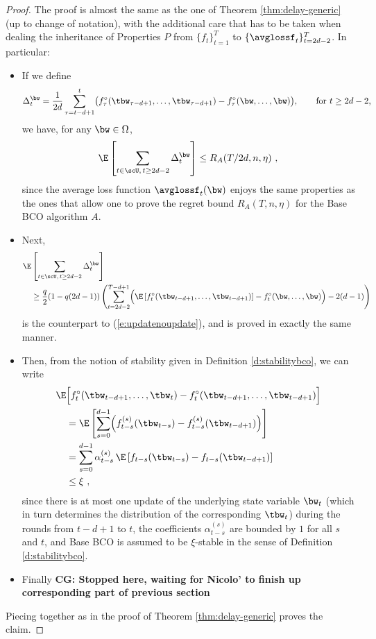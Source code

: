 %
\begin{proof}
The proof is almost the same as the one of Theorem \ref{thm:delay-generic} (up to change of notation), with the additional care that has to be taken when dealing the inheritance of Properties $P$ from $\{f_t\}_{t=1}^T$ to $\{\avglossf_t\}_{t=2d-2}^T$.
%
In particular:
\begin{itemize}
\item If we define
\[
\Delta_t^{\bw} = \frac{1}{2d}\sum_{\tau=t-d+1}^t \bigl(\fcomp_\tau(\tbw_{\tau-d+1},\dots,\tbw_{\tau-d+1}) - \fcomp_\tau(\bw,\dots,\bw)\bigl),\qquad {\mbox{for $t \geq 2d-2$,}}
\]
we have, for any $\bw \in \Omega$,
\[
\E\left[\sum_{t \in \scU,\, t\geq 2d-2} \Delta_t^{\bw}  \right] \leq R_A(T/2d, n ,\eta)~,
\]
since the average loss function $\avglossf_t(\bw)$ enjoys the same properties as the ones that allow one to prove the regret bound $R_A(T, n ,\eta)$ for the Base BCO algorithm $A$.
%
\item Next,
%
\begin{align*}
\E&\left[\sum_{t \in \scU,\,t\geq 2d-2} \Delta_t^{\bw} \right] \\
  &\geq
    \frac{q}{2}(1-q(2d-1))\left(\sum_{t=2d-2}^{T-d+1} \Bigl(\E\left[\fcomp_t(\tbw_{t-d+1},\dots,\tbw_{t-d+1})\right] - \fcomp_t(\bw,\dots,\bw)\Bigr) -2(d-1)\right)
\end{align*}
%
is the counterpart to (\ref{e:updatenoupdate}), and is proved in exactly the same manner.
%
\item Then, from the notion of stability given in Definition \ref{d:stabilitybco}, we can write
%
\begin{align*}
    \E&\Bigl[ \fcomp_t(\tbw_{t-d+1},\dots,\tbw_t) - \fcomp_t(\tbw_{t-d+1},\dots,\tbw_{t-d+1}) \Bigr]
\\&=
    \E\left[ \sum_{s=0}^{d-1} \Bigl( f_{t-s}^{(s)}(\tbw_{t-s}) - f_{t-s}^{(s)}(\tbw_{t-d+1})   \Bigr)\right]
\\&=
    \sum_{s=0}^{d-1}\alpha_{t-s}^{(s)}\,\E\left[ f_{t-s}(\tbw_{t-s}) - f_{t-s}(\tbw_{t-d+1})\right]
\\&\leq
\xi~,
\end{align*}
since there is at most one update of the underlying state variable $\bw_t$ (which in turn determines the distribution of the corresponding $\tbw_t$)
during the rounds from $t-d+1$ to $t$, the coefficients $\alpha_{t-s}^{(s)}$ are bounded by $1$ for all $s$ and $t$, and Base BCO is assumed to be $\xi$-stable in 
the sense of Definition \ref{d:stabilitybco}.
%
\item Finally
{\bf CG: Stopped here, waiting for Nicolo' to finish up corresponding part of previous section}

\end{itemize}
Piecing together as in the proof of Theorem \ref{thm:delay-generic} proves the claim.
\end{proof}
